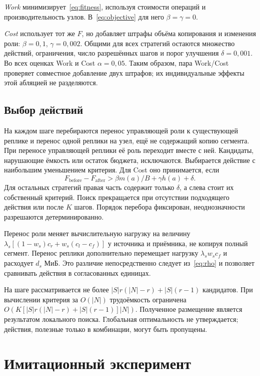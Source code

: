 \documentclass{misisarticle}
\begin{document}
\textit{Work} минимизирует~\eqref{eq:fitness}, используя стоимости операций и производительность узлов. В~\eqref{eq:objective} для него $\beta=\gamma=0$.

\textit{Cost} использует тот же $F$, но добавляет штрафы объёма копирования и изменения роли: $\beta=0{,}1$, $\gamma=0{,}002$. Общими для всех стратегий остаются множество действий, ограничения, число разрешённых шагов и порог улучшения $\delta=0{,}001$. Во всех оценках Work и Cost $\alpha=0{,}05$. Таким образом, пара Work/Cost проверяет совместное добавление двух штрафов; их индивидуальные эффекты этой абляцией не разделяются.

\subsection{Выбор действий}
На каждом шаге перебираются перенос управляющей роли к существующей реплике и перенос одной реплики на узел, ещё не содержащий копию сегмента. При переносе управляющей реплики её роль переходит вместе с ней. Кандидаты, нарушающие ёмкость или остаток бюджета, исключаются. Выбирается действие с наибольшим уменьшением критерия. Для Cost оно принимается, если
\begin{equation}
F_{\mathrm{before}}-F_{\mathrm{after}}>\beta m(a)/B+\gamma h(a)+\delta.
\label{eq:accept}
\end{equation}
Для остальных стратегий правая часть содержит только $\delta$, а слева стоит их собственный критерий. Поиск прекращается при отсутствии подходящего действия или после $K$ шагов. Порядок перебора фиксирован, неоднозначности разрешаются детерминированно.

Перенос роли меняет вычислительную нагрузку на величину $\lambda_s[(1-w_s)c_r+w_s(c_l-c_f)]$ у источника и приёмника, не копируя полный сегмент. Перенос реплики дополнительно перемещает нагрузку $\lambda_sw_sc_f$ и расходует $d_s$ МиБ. Это различие непосредственно следует из~\eqref{eq:rho} и позволяет сравнивать действия в согласованных единицах.

На шаге рассматривается не более $|S|r(|N|-r)+|S|(r-1)$ кандидатов. При вычислении критерия за $O(|N|)$ трудоёмкость ограничена $O(K[|S|r(|N|-r)+|S|(r-1)]|N|)$. Полученное размещение является результатом локального поиска. Глобальная оптимальность не утверждается; действия, полезные только в комбинации, могут быть пропущены.

\section{Имитационный эксперимент}
\end{document}
